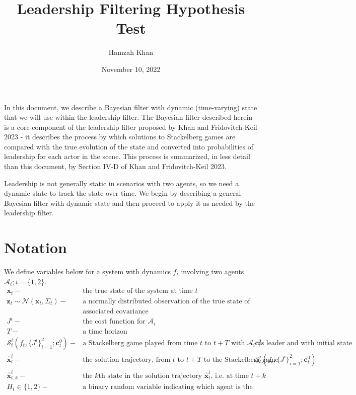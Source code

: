 \documentclass[11pt]{article}
\title{Leadership Filtering Hypothesis Test}
\author{Hamzah Khan} \date{November 10, 2022}
\newcommand\truestate[1]{\bm{x}_{#1}}
\newcommand\agent[1]{\mathcal{A}_{#1}}
\newcommand\stack[2]{\mathcal{S}^{#1}_{#2}}
\newcommand\costfn[1]{J^{#1}}
\newcommand\obs[1]{\bm{z}_{#1}}
\newcommand\horizon{T}
\newcommand\stackmeas[2]{\bm{\hat{x}}^{#1}_{#2}}
\newcommand\statecov[1]{\Sigma_{#1}}
\newcommand\initcond[1]{\bm{c}^{0}_{#1}}
\begin{document}
\maketitle

In this document, we describe a Bayesian filter with dynamic (time-varying) state that we will use within the leadership filter. The Bayesian filter described herein is a core component of the leadership filter proposed by Khan and Fridovitch-Keil 2023 - it describes the process by which solutions to Stackelberg games are compared with the true evolution of the state and converted into probabilities of leadership for each actor in the scene. This process is summarized, in less detail than this document, by Section IV-D of Khan and Fridovitch-Keil 2023. 

Leadership is not generally static in scenarios with two agents, so we need a dynamic state to track the state over time. We begin by describing a general Bayesian filter with dynamic state and then proceed to apply it as needed by the leadership filter.

\section{Notation}
We define variables below for a system with dynamics $f_t$ involving two agents $\agent{i}; i = \{1, 2\}$.
\begin{align*}
\truestate{t} - &\text{the true state of the system at time } t \\
\obs{t} \sim \mathcal{N}(\truestate{t}, \statecov{t}) - &\text{a normally distributed observation of the true state of the system, with} \\
    &\text{associated covariance} \\
\costfn{i} - &\text{the cost function for $\agent{i}$} \\
\horizon - &\text{a time horizon} \\
\stack{i}{t}(f_t, \{ \costfn{i} \}_{i=1}^2; \initcond{t}) - &\text{a Stackelberg game played from time $t$ to $t + T$ with $\agent{i}$ as leader and with initial state } \initcond{t} \\
\stackmeas{i}{t} - &\text{the solution trajectory, from $t$ to $t+T$ to the Stackelberg game } \stack{i}{t}(f_t, \{ \costfn{i} \}_{i=1}^2; \initcond{t}) \\
\stackmeas{i}{t, k} - &\text{the $k$th state in the solution trajectory $\stackmeas{i}{t}$, i.e. at time $t + k$} \\
H_t \in \{ 1, 2 \} - &\text{a binary random variable indicating which agent is the leader}
\end{align*}
\end{document}
